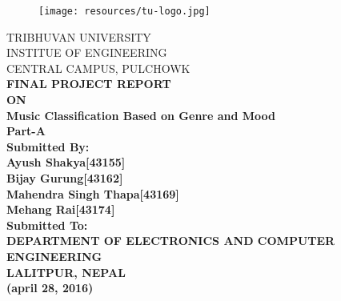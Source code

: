    \newpage
    \begin{figure}[t]
            \centering
            \texttt{[image: resources/tu-logo.jpg]}
    \end{figure}
    \begin{nscenter}
            TRIBHUVAN UNIVERSITY\\ 
            INSTITUE OF ENGINEERING\\
            CENTRAL CAMPUS, PULCHOWK\\
            \vspace{20mm}
            \bfseries{FINAL PROJECT REPORT\\
            ON\\
            Music Classification Based on Genre and Mood\\
            Part-A\\
             }
            \vspace{12mm}
            \textbf {Submitted By:}\\
            \textnormal{
            Ayush Shakya\hspace{25mm}[43155]\\
            Bijay Gurung\hspace{25mm}[43162]\\
            Mahendra Singh Thapa\hspace{9mm}[43169]\\
            Mehang Rai\hspace{28mm}[43174]\\
    } 
            \vspace{15mm}
            \textbf{ Submitted To:}\\
            \textnormal{
            DEPARTMENT OF ELECTRONICS AND COMPUTER ENGINEERING\\
            LALITPUR, NEPAL\\
            \vspace{15mm}
    (april 28, 2016)}
    \end{nscenter}
    

